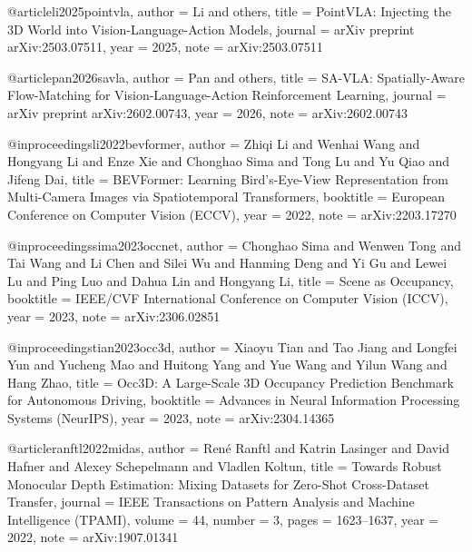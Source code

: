 @article{li2025pointvla,
  author    = {Li and others},
  title     = {{PointVLA}: Injecting the 3D World into Vision-Language-Action Models},
  journal   = {arXiv preprint arXiv:2503.07511},
  year      = {2025},
  note      = {arXiv:2503.07511}
}

@article{pan2026savla,
  author    = {Pan and others},
  title     = {{SA-VLA}: Spatially-Aware Flow-Matching for Vision-Language-Action Reinforcement Learning},
  journal   = {arXiv preprint arXiv:2602.00743},
  year      = {2026},
  note      = {arXiv:2602.00743}
}


@inproceedings{li2022bevformer,
  author    = {Zhiqi Li and Wenhai Wang and Hongyang Li and Enze Xie and Chonghao Sima and Tong Lu and Yu Qiao and Jifeng Dai},
  title     = {{BEVFormer}: Learning Bird's-Eye-View Representation from Multi-Camera Images via Spatiotemporal Transformers},
  booktitle = {European Conference on Computer Vision (ECCV)},
  year      = {2022},
  note      = {arXiv:2203.17270}
}

@inproceedings{sima2023occnet,
  author    = {Chonghao Sima and Wenwen Tong and Tai Wang and Li Chen and Silei Wu and Hanming Deng and Yi Gu and Lewei Lu and Ping Luo and Dahua Lin and Hongyang Li},
  title     = {Scene as Occupancy},
  booktitle = {IEEE/CVF International Conference on Computer Vision (ICCV)},
  year      = {2023},
  note      = {arXiv:2306.02851}
}

@inproceedings{tian2023occ3d,
  author    = {Xiaoyu Tian and Tao Jiang and Longfei Yun and Yucheng Mao and Huitong Yang and Yue Wang and Yilun Wang and Hang Zhao},
  title     = {{Occ3D}: A Large-Scale 3D Occupancy Prediction Benchmark for Autonomous Driving},
  booktitle = {Advances in Neural Information Processing Systems (NeurIPS)},
  year      = {2023},
  note      = {arXiv:2304.14365}
}

@article{ranftl2022midas,
  author    = {Ren\'{e} Ranftl and Katrin Lasinger and David Hafner and Alexey Schepelmann and Vladlen Koltun},
  title     = {Towards Robust Monocular Depth Estimation: Mixing Datasets for Zero-Shot Cross-Dataset Transfer},
  journal   = {IEEE Transactions on Pattern Analysis and Machine Intelligence (TPAMI)},
  volume    = {44},
  number    = {3},
  pages     = {1623--1637},
  year      = {2022},
  note      = {arXiv:1907.01341}
}

